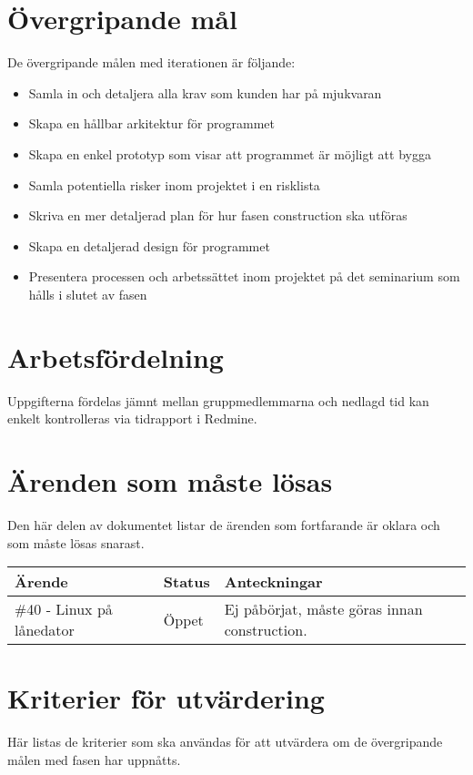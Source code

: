 \section{Övergripande mål}
De övergripande målen med iterationen är följande:

\begin{itemize}
	\item Samla in och detaljera alla krav som kunden har på mjukvaran
	\item Skapa en hållbar arkitektur för programmet
	\item Skapa en enkel prototyp som visar att programmet är möjligt att bygga
	\item Samla potentiella risker inom projektet i en risklista
	\item Skriva en mer detaljerad plan för hur fasen construction ska utföras
	\item Skapa en detaljerad design för programmet
	\item Presentera processen och arbetssättet inom projektet på det seminarium som hålls i slutet av fasen
\end{itemize}

\section{Arbetsfördelning}
Uppgifterna fördelas jämnt mellan gruppmedlemmarna och nedlagd tid kan enkelt kontrolleras via tidrapport i Redmine.

\section{Ärenden som måste lösas}
Den här delen av dokumentet listar de ärenden som fortfarande är oklara och som måste lösas snarast.

\begin{center}
	\begin{tabular}{| l | l | l |}
		\hline Ärende & Status & Anteckningar \\
		\hline \#40 - Linux på lånedator & Öppet & Ej påbörjat, måste göras innan construction. \\
		\hline
	\end{tabular}
\end{center}

\section{Kriterier för utvärdering}
Här listas de kriterier som ska användas för att utvärdera om de övergripande målen med fasen har uppnåtts.


